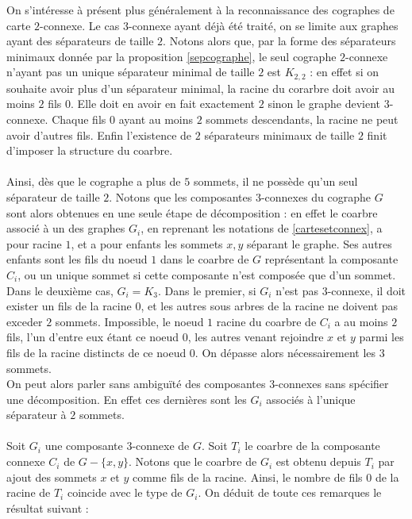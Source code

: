 \documentclass{scrartcl}
\begin{document}
\begin{flushleft}
On s'intéresse à présent plus généralement à la reconnaissance des cographes de carte $2$-connexe. Le cas $3$-connexe ayant déjà été traité,
on se limite aux graphes ayant des séparateurs de taille $2$. Notons alors que, par la forme des séparateurs minimaux donnée par la proposition
\ref{sepcographe}, le seul cographe $2$-connexe n'ayant pas un unique séparateur minimal de taille $2$ est $K_{2,2}$ : en effet si on souhaite avoir
plus d'un séparateur minimal, la racine du corarbre doit avoir au moins $2$ fils $0$. Elle doit en avoir en fait exactement $2$ sinon le
graphe devient $3$-connexe. Chaque fils $0$ ayant au moins $2$ sommets descendants, la racine ne peut avoir d'autres fils. Enfin l'existence
de $2$ séparateurs minimaux de taille $2$ finit d'imposer la structure du coarbre.
\\~\\
Ainsi, dès que le cographe a plus de $5$ sommets, il ne possède qu'un seul séparateur de taille $2$. Notons que les composantes $3$-connexes
du cographe $G$ sont alors obtenues en une seule étape de décomposition : en effet le coarbre associé à un des graphes $G_i$, en reprenant
les notations de \ref{cartesetconnex}, a pour racine $1$, et a pour enfants les sommets $x,y$ séparant le graphe.
Ses autres enfants sont les fils du noeud $1$ dans le coarbre de $G$ représentant la composante $C_i$, ou un unique sommet si
cette composante n'est composée que d'un sommet. Dans le deuxième cas, $G_i = K_3$. Dans le premier, si $G_i$ n'est pas $3$-connexe,
il doit exister un fils de la racine $0$, et les autres sous arbres de la racine ne doivent pas exceder $2$ sommets. Impossible,
le noeud $1$ racine du coarbre de $C_i$ a au moins $2$ fils, l'un d'entre eux étant ce noeud $0$, les autres venant rejoindre $x$ et $y$
parmi les fils de la racine distincts de ce noeud $0$. On dépasse alors nécessairement les $3$ sommets.\\
On peut alors parler sans ambiguïté des composantes $3$-connexes sans spécifier une décomposition. En effet ces dernières sont
les $G_i$ associés à l'unique séparateur à $2$ sommets.
\\~\\
Soit $G_i$ une composante $3$-connexe de $G$. Soit $T_i$ le coarbre de la composante connexe $C_i$ de $G - \{x,y\}$.
Notons que le coarbre de $G_i$ est obtenu depuis $T_i$ par ajout des sommets $x$ et $y$ comme fils de la racine. Ainsi, le nombre de fils
$0$ de la racine de $T_i$ coincide avec le type de $G_i$. On déduit de toute ces remarques le résultat suivant :


\end{flushleft}
\end{document}

